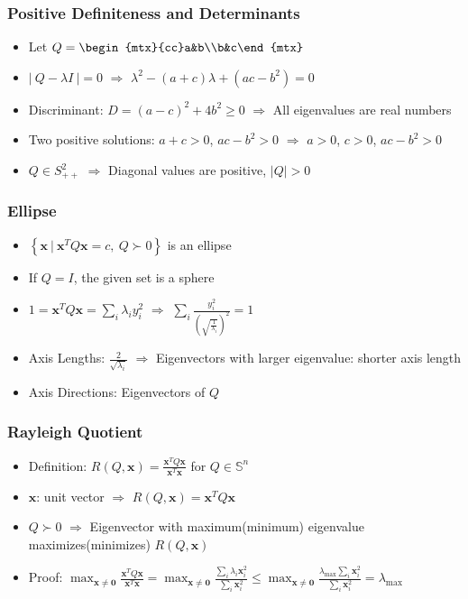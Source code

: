 \subsubsection*{Positive Definiteness and Determinants}
\begin{itemize}
    \item Let $Q = \begin{mtx}{cc}a&b\\b&c\end{mtx}$
    \item $|~Q - \lambda I~| = 0$ $\Rightarrow$ $\lambda^2 - (a + c)\lambda + \left( ac - b^2 \right) = 0$
    \item Discriminant: $D = (a - c)^2 + 4b^2 \geq 0$ $\Rightarrow$ All eigenvalues are real numbers
    \item Two positive solutions: $a + c > 0$, $ac - b^2 > 0$ $\Rightarrow$ $a > 0$, $c > 0$, $ac - b^2 > 0$
    \item $Q \in S_{++}^2$ $\Rightarrow$ Diagonal values are positive, $|Q| > 0$
\end{itemize}

\subsubsection*{Ellipse}
\begin{itemize}
    \item $\left\{\mathbf{x}~|~\mathbf{x}^TQ\mathbf{x}=c,~Q \succ 0\right\}$ is an ellipse
    \item If $Q = I$, the given set is a sphere
    \item $1 = \mathbf{x}^T Q\mathbf{x} = \sum_i \lambda_i y_i^2$ $\Rightarrow$
        $\sum_i \frac {y_i^2} {\left( \sqrt{\frac 1 {\lambda_i}} \right)^2} = 1$
    \item Axis Lengths: $\frac 2 {\sqrt {\lambda_i}}$ $\Rightarrow$ Eigenvectors with larger eigenvalue: shorter axis length
    \item Axis Directions: Eigenvectors of $Q$
\end{itemize}

\subsubsection*{Rayleigh Quotient}
\begin{itemize}
    \item Definition: $R(Q, \mathbf{x}) = \frac {\mathbf{x}^T Q\mathbf{x}} {\mathbf{x}^T\mathbf{x}}$ for $Q \in \mathbb{S}^n$
    \item $\mathbf{x}$: unit vector $\Rightarrow$ $R(Q, \mathbf{x}) = \mathbf{x}^TQ\mathbf{x}$
    \item $Q \succ 0$ $\Rightarrow$ Eigenvector with maximum(minimum) eigenvalue maximizes(minimizes) $R(Q, \mathbf{x})$
    \item Proof: $\max_{\mathbf{x} \neq \mathbf{0}} \frac {\mathbf{x}^T Q\mathbf{x}} {\mathbf{x}^T\mathbf{x}}
        = \max_{\mathbf{x} \neq \mathbf{0}} \frac {\sum_i \lambda_i \mathbf{x}_i^2} {\sum_i \mathbf{x}_i^2}
        \leq \max_{\mathbf{x} \neq \mathbf{0}} \frac {\lambda_{\mathrm{max}}\sum_i \mathbf{x}_i^2} {\sum_i \mathbf{x}_i^2}
        = \lambda_{\mathrm{max}}$
\end{itemize}
